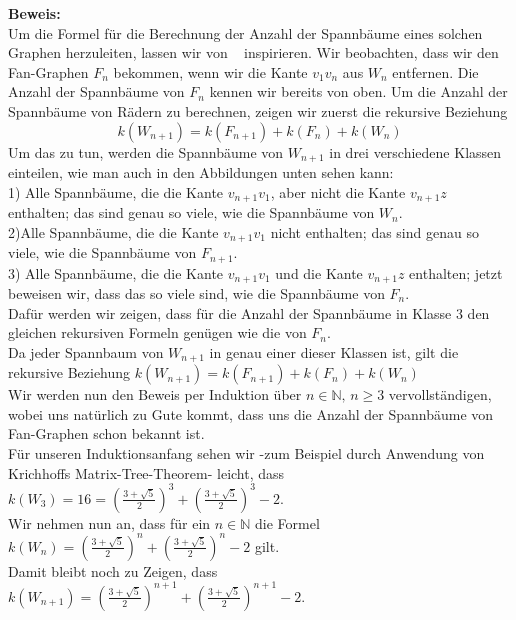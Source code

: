 \textbf{Beweis:}\\
Um die Formel für die Berechnung der Anzahl der Spannbäume eines solchen Graphen herzuleiten, lassen wir von ~\cite{sedlacek_1970} inspirieren.
Wir beobachten, dass wir den Fan-Graphen $F_n$ bekommen, wenn wir die Kante $v_1v_n$ aus $W_n$ entfernen.
Die Anzahl der Spannbäume von $F_n$ kennen wir bereits von oben.
Um die Anzahl der Spannbäume von Rädern zu berechnen, zeigen wir zuerst die rekursive Beziehung
\begin{equation}
 \mathit{k}(W_{n+1}) = \mathit{k}(F_{n+1}) + \mathit{k}(F_n) + \mathit{k}(W_n)
\end{equation}
Um das zu tun, werden die Spannbäume von $W_{n+1}$ in drei verschiedene Klassen einteilen, wie man auch in den Abbildungen unten sehen kann:\\
1) Alle Spannbäume, die die Kante $v_{n+1}v_1$, aber nicht die Kante $v_{n+1}z$ enthalten; das sind genau so viele, wie die Spannbäume von $W_n$. \\%
2)Alle Spannbäume, die die Kante $v_{n+1}v_1$ nicht enthalten; das sind genau so viele, wie die Spannbäume von $F_{n+1}$.\\%
3) Alle Spannbäume, die die Kante $v_{n+1}v_1$ und die Kante $v_{n+1}z$ enthalten; jetzt beweisen wir, dass das so viele sind, wie die Spannbäume von $F_n$.\\
Dafür werden wir zeigen, dass für die Anzahl der Spannbäume in Klasse $3$ den gleichen rekursiven Formeln genügen wie die von $F_n$.\\
Da jeder Spannbaum von $W_{n+1}$ in genau einer dieser Klassen ist, gilt die rekursive Beziehung
$\mathit{k}(W_{n+1}) = \mathit{k}(F_{n+1}) + \mathit{k}(F_n) + \mathit{k}(W_n)$\\
Wir werden nun den Beweis per Induktion über $n \in \mathbb{N}, \, n \geq 3$ vervollständigen, wobei uns natürlich zu Gute kommt, dass uns die Anzahl der Spannbäume von Fan-Graphen schon bekannt ist.\\
Für unseren Induktionsanfang sehen wir -zum Beispiel durch Anwendung von Krichhoffs Matrix-Tree-Theorem- leicht, dass $\mathit{k}(W_3) = 16 = (\frac{3+\sqrt{5}}{2})^3+(\frac{3+\sqrt{5}}{2})^3-2$.\\
Wir nehmen nun an, dass für ein $n \in \mathbb{N}$ die Formel $\mathit{k}(W_n) = (\frac{3+\sqrt{5}}{2})^n+(\frac{3+\sqrt{5}}{2})^n-2$ gilt.\\
Damit bleibt noch zu Zeigen, dass  $\mathit{k}(W_{n+1}) = (\frac{3+\sqrt{5}}{2})^{n+1}+(\frac{3+\sqrt{5}}{2})^{n+1}-2$.\\
